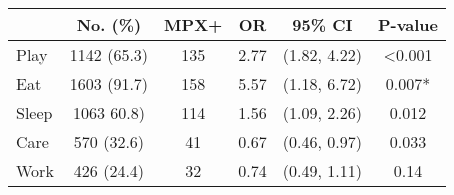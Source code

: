 \begin{tabular}{lccccc}

\toprule
 & No. (\%) & MPX+ & OR & 95\% CI & P-value \\
\midrule
Play & 1142 (65.3) & 135 & 2.77 & (1.82, 4.22) & <0.001 \\
Eat & 1603 (91.7) & 158 & 5.57 & (1.18, 6.72) & 0.007* \\
Sleep & 1063 60.8) & 114 & 1.56 & (1.09, 2.26) & 0.012 \\
Care & 570 (32.6) & 41 & 0.67 & (0.46, 0.97) & 0.033 \\
Work & 426 (24.4) & 32 & 0.74 & (0.49, 1.11) & 0.14 \\

\bottomrule
\end{tabular}